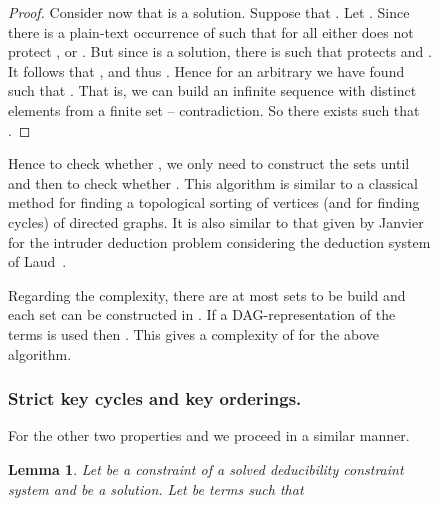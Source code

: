 \documentclass[acmtocl,acmnow]{acmtrans2m}
\newtheorem{lemma}[theorem]{Lemma}
\newcommand{\dedsys}[1]{deducibility constraint system}
\begin{document}
\begin{figure}[t]
{{\begin{proof}
Consider now that  is a solution. Suppose that . Let . Since  there is a plain-text occurrence 
of  such that for all  either  does not protect , or . But
since  is a solution, there is  such that  protects  and . It follows that
, and thus . Hence for an arbitrary  we have
found  such that . That is, we can build an infinite sequence
 with distinct elements from a finite set -- contradiction. So there exists 
such that .
\end{proof}

Hence to check whether , we only need to construct the sets  until
 and then to check whether . This algorithm is similar to a classical method for
finding a topological sorting of vertices (and for finding cycles) of directed graphs. 
It is also similar to
that given by Janvier~\cite{Janvier-these} for the intruder deduction problem considering the deduction
system of Laud~\cite{Laud-NORDSEC02}.

Regarding the complexity, there are at most  sets to be build and each set  can be constructed in
. If a DAG-representation of the terms is used then
. This gives a complexity of 
for the above algorithm.

\medskip

\subsubsection{Strict key cycles and key orderings.}
For the other two properties  and  we proceed in a similar manner. 















\begin{lemma}\label{lem:encrypts_deduc}
Let  be a constraint of a solved \dedsys{}  and  be a
 solution. Let  be terms such that


\end{lemma}}}
\end{figure}
\end{document}
